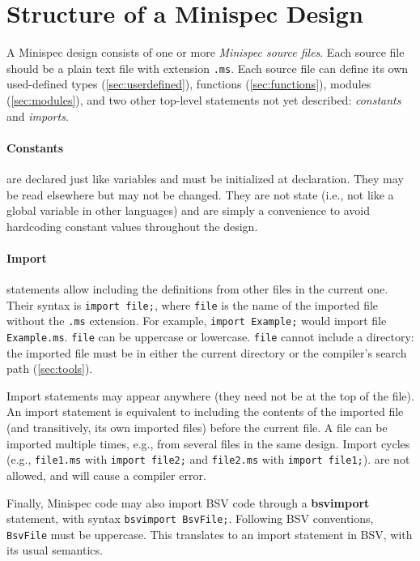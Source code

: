 \section{Structure of a Minispec Design}
\label{sec:design}

A Minispec design consists of one or more \emph{Minispec source files}.
Each source file should be a plain text file with extension \verb|.ms|.
Each source file can define its own used-defined types (\autoref{sec:userdefined}),
functions (\autoref{sec:functions}), modules (\autoref{sec:modules}),
and two other top-level statements not yet described: \emph{constants} and \emph{imports}.

\paragraph{Constants} are declared just like variables and must be initialized at declaration.
They may be read elsewhere but may not be changed. They are not state
(i.e., not like a global variable in other languages) and are simply a convenience
to avoid hardcoding constant values throughout the design.

\paragraph{Import} statements allow including the definitions from other files in the current one.
Their syntax is \verb|import file;|, where \verb|file| is the name of the imported file without the \verb|.ms| extension.
For example, \verb|import Example;| would import file \verb|Example.ms|.
\verb|file| can be uppercase or lowercase.
\verb|file| cannot include a directory: the imported file must be
in either the current directory or the compiler's search path (\autoref{sec:tools}).

Import statements may appear anywhere (they need not be at the top of the file).
An import statement is equivalent to including the contents of the imported file (and transitively, its own imported files)
before the current file.
A file can be imported multiple times, e.g., from several files in the same design.
Import cycles
(e.g., \verb|file1.ms| with \verb|import file2;| and \verb|file2.ms| with \verb|import file1;|).
are not allowed, and will cause a compiler error.

Finally, Minispec code may also import BSV code through a \textbf{bsvimport} statement, with syntax
\verb|bsvimport BsvFile;|. Following BSV conventions, \verb|BsvFile| must be uppercase.
This translates to an import statement in BSV, with its usual semantics.
